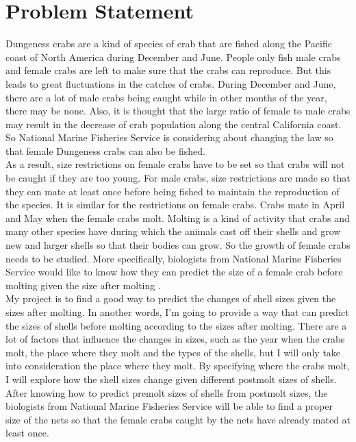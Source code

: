 \documentclass[12pt,letterpaper]{article}
\theoremstyle{definition}
\begin{document}
\section{Problem Statement}
Dungeness crabs are a kind of species of crab that are fished along the Pacific coast of North America during December and June. People only fish male crabs and female crabs are left to make sure that the crabs can reproduce. But this leads to great fluctuations in the catches of crabs. During December and June, there are a lot of male crabs being caught while in other months of the year, there may be none. Also, it is thought that the large ratio of female to male crabs may result in the decrease of crab population along the central California coast. So National Marine Fisheries Service is considering about changing the law so that female Dungeness crabs can also be fished.\\
As a result, size restrictions on female crabs have to be set so that crabs will not be caught if they are too young. For male crabs, size restrictions are made so that they can mate at least once before being fished to maintain the reproduction of the species. It is similar for the restrictions on female crabs. Crabs mate in April and May when the female crabs molt. Molting is a kind of activity that crabs and many other species have during which the animals cast off their shells and grow new and larger shells so that their bodies can grow. So the growth of female crabs needs to be studied. More specifically, biologists from National Marine Fisheries Service would like to know how they can predict the size of a female crab before molting given the size after molting \cite{deb}.\\
My project is to find a good way to predict the changes of shell sizes given the sizes after molting. In another words, I'm going to provide a way that can predict the sizes of shells before molting according to the sizes after molting. There are a lot of factors that influence the changes in sizes, such as the year when the crabs molt, the place where they molt and the types of the shells, but I will only take into consideration the place where they molt. By specifying where the crabs molt, I will explore how the shell sizes change given different postmolt sizes of shells.\\
After knowing how to predict premolt sizes of shells from postmolt sizes, the biologists from National Marine Fisheries Service will be able to find a proper size of the nets so that the female crabs caught by the nets have already mated at least once.
\end{document}
